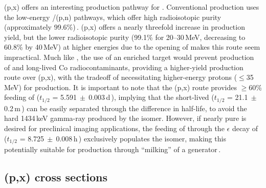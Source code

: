 (p,x) offers an interesting production pathway for  .
Conventional production uses the low-energy /(p,n) pathways, which offer high radioisotopic purity (approximately 99.6\%)\,\cite{Graves2015,Wooten2015}.
(p,x) offers a nearly threefold increase in production yield, but the lower radioisotopic purity (99.1\% for 20--30\,MeV, decreasing to 60.8\% by 40\,MeV) at higher energies due to the opening of  makes this route seem impractical.
Much like , the use of an enriched  target would prevent production of  and long-lived Co radiocontaminants, providing a higher-yield production route over   (p,x), with the tradeoff of necessitating higher-energy protons ($\leq$35\,MeV) for production.
It is important to note that the (p,x) route provides $\geq$60\% feeding of  ($t_{1/2}$ = 5.591$~\pm~$0.003\,d\,\cite{Dong2015}), implying that the short-lived   ($t_{1/2}$ = 21.1$~\pm~$0.2\,m\,\cite{Dong2015}) can be easily separated through the difference in half-life, to avoid the 
hard 1434\,keV gamma-ray produced by the isomer. 
However, if nearly pure  is desired for preclinical imaging applications, the feeding of  through the $\epsilon$ decay of  ($t_{1/2}$ = 8.725$~\pm~$0.008\,h\,\cite{Dong2015}) exclusively populates the isomer, making this potentially suitable for production through \enquote{milking} of a  generator\,\cite{Blauenstein1997}.







\subsection{(p,x) cross sections}


